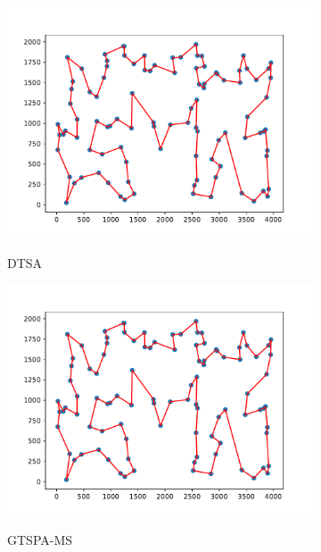 \documentclass[12pt]{article}
\theoremstyle{plain}
\theoremstyle{definition}
\theoremstyle{remark}
\begin{document}
\begin{figure}[ht]
	\centering
	\begin{subfigure}{.5\textwidth}
		\centering
		\includegraphics[scale = 0.44]{../../Implementation/gen/best_path_dtsa_kroA100}
		\label{fig:best_path_dtsa_kroA100}
		\caption{DTSA}
	\end{subfigure}%
	\begin{subfigure}{.5\textwidth}
		\centering
		\includegraphics[scale = 0.44]{../../Implementation/gen/best_path_gtspams_kroA100}
		\label{fig:best_path_gtspams_kroA100}
		\caption{GTSPA-MS}
	\end{subfigure}
	\begin{subfigure}{.5\textwidth}
		\centering

\end{subfigure}
\end{figure}
\end{document}
